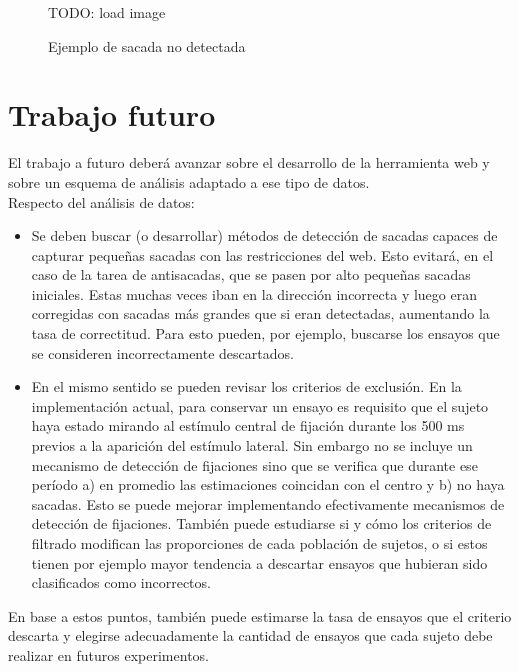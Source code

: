 \begin{figure}
  \centering
  TODO: load image
  \caption{Ejemplo de sacada no detectada}
  \label{fig:undetected-saccade}
\end{figure}

\section{Trabajo futuro}

El trabajo a futuro deberá avanzar sobre el desarrollo de la herramienta web y
sobre un esquema de análisis adaptado a ese tipo de datos. \\
Respecto del análisis de datos: 
\begin{itemize}
  \item Se deben buscar (o desarrollar) métodos de detección de sacadas capaces
de capturar pequeñas sacadas con las restricciones del \eyetracking web.
  Esto evitará, en el caso de la tarea de antisacadas, que se pasen por alto
pequeñas sacadas iniciales.
  Estas muchas veces iban en la dirección incorrecta y luego eran corregidas
con sacadas más grandes que si eran detectadas, aumentando la tasa de
correctitud.
  Para esto pueden, por ejemplo, buscarse los ensayos que se consideren
incorrectamente descartados. 

  \item En el mismo sentido se pueden revisar los criterios de exclusión.
  En la implementación actual, para conservar un ensayo es requisito que el
sujeto haya estado mirando al estímulo central de fijación durante los 500 ms
previos a la aparición del estímulo lateral.
  Sin embargo no se incluye un mecanismo de detección de fijaciones sino que se
verifica que durante ese período a) en promedio las estimaciones coincidan con
el centro y b) no haya sacadas.
  Esto se puede mejorar implementando efectivamente mecanismos de detección de
fijaciones.
  También puede estudiarse si y cómo los criterios de filtrado modifican las
proporciones de cada población de sujetos, o si estos tienen por ejemplo mayor
tendencia a descartar ensayos que hubieran sido clasificados como incorrectos.
\end{itemize}

En base a estos puntos, también puede estimarse la tasa de ensayos que el
criterio descarta y elegirse adecuadamente la cantidad de ensayos que cada
sujeto debe realizar en futuros experimentos.

